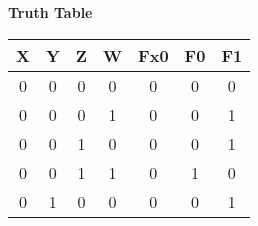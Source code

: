 \textbf{Truth Table }

\begin{tabular}{|c|c|c|c||c|c|c|}
\hline
X & Y & Z & W

  & Fx0

  & F0

  & F1
 \\
\hline

  
  
  0 & 0 & 0 & 0
  
    
    
    & 0
  
    
    
    & 0
  
    
    
    & 0
   \\
  

  
  
  0 & 0 & 0 & 1
  
    
    
    & 0
  
    
    
    & 0
  
    
    
    & 1
   \\
  

  
  
  0 & 0 & 1 & 0
  
    
    
    & 0
  
    
    
    & 0
  
    
    
    & 1
   \\
  

  
  
  0 & 0 & 1 & 1
  
    
    
    & 0
  
    
    
    & 1
  
    
    
    & 0
   \\
  \hline

  
  
  0 & 1 & 0 & 0
  
    
    
    & 0
  
    
    
    & 0
  
    
    
    & 1
   \\
  


\end{tabular}

